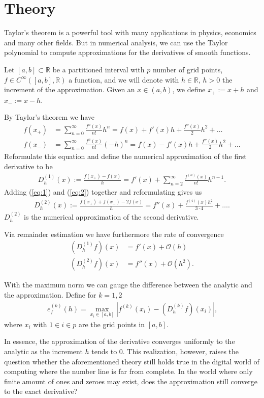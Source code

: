 \section{Theory}
Taylor's theorem is a powerful tool with many applications in physics, economics and many other fields. But in numerical analysis, we can use the Taylor polynomial to compute approximations for the derivatives of smooth functions.

Let \([a, b] \subset \mathbb{R}\) be a partitioned interval with \(p\) number of grid points, \(f \in C^{\infty}([a, b], \mathbb{R})\) a function, and we will denote with \(h \in \mathbb{R}\), \(h > 0\) the increment of the approximation. Given an \(x \in (a, b)\), we define \(x_{+} := x + h\) and \(x_{-} := x - h\).

By Taylor's theorem \cite{H.Amann} we have
\begin{align}
    f(x_{+}) &= \sum^{\infty}_{n = 0} \frac{f^{n}(x)}{n!} h^n = f(x) + f'(x)h + \frac{f''(x)}{2}h^2 + \dots \label{eq:1}\\
    f(x_{-}) &= \sum^{\infty}_{n = 0} \frac{f^{n}(x)}{n!} (-h)^n = f(x) - f'(x)h + \frac{f''(x)}{2}h^2 + \dots \label{eq:2}
\end{align}
Reformulate this equation and define the numerical approximation of the first derivative to be
\begin{align*}
    D^{(1)}_h (x) := \frac{f(x_{+}) - f(x)}{h} = f'(x) + \sum^{\infty}_{n = 2} \frac{f^{(n)} (x)}{n!}h^{n-1} \text{.}
\end{align*}
Adding (\ref{eq:1}) and (\ref{eq:2}) together and reformulating gives us
\begin{align*}
    D^{(2)}_h (x) := \frac{f(x_{+}) + f(x_{-}) - 2f(x)}{h} = f''(x) + \frac{f^{(4)}(x)h^2}{3 \cdot 4} + \dots \text{.}
\end{align*}
\(D^{(2)}_h\) is the numerical approximation of the second derivative.

Via remainder estimation we have furthermore the rate of convergence
\begin{align*}
    (D^{(1)}_h f) (x) &= f'(x) + \mathcal{O}(h) \\
    (D^{(2)}_h f) (x) &= f''(x) + \mathcal{O}(h^2) \text{.}
\end{align*}

With the maximum norm we can gauge the difference between the analytic and the approximation. Define for \(k = 1, 2\)
\begin{align*}
    e^{(k)}_f (h) = \max_{x_i \in [a, b]} \left| f^{(k)} (x_i) - (D^{(k)}_h f) (x_i)\right| \text{,}
\end{align*}
where \(x_i\) with \(1 \in i \in p\) are the grid points in \([a, b]\).

In essence, the approximation of the derivative converges uniformly to the analytic as the increment \(h\) tends to \(0\). This realization, however, raises the question whether the aforementioned theory still holds true in the digital world of computing where the number line is far from complete. In the world where only finite amount of ones and zeroes may exist, does the approximation still converge to the exact derivative?\\